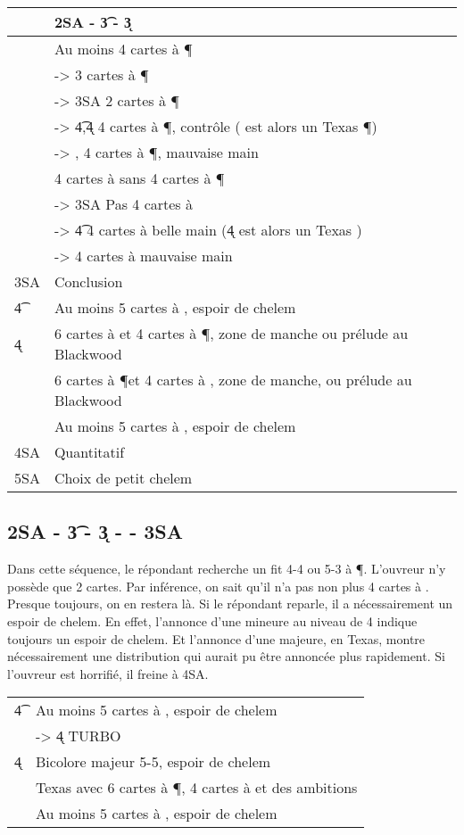 \documentclass[a4paper,12pt]{article}
\begin{document}
\begin{tabular}{|l|l|}
\hline
&2SA - \t3 - \k3\\
\hline
\co3 & Au moins 4 cartes à \P\\
& -> \p3 3 cartes à \P\\
& -> 3SA 2 cartes à \P \\
& -> \t4,\k4 4 cartes à \P, contrôle (\co4 est alors un Texas \P) \\
& -> \p4, 4 cartes à \P, mauvaise main \\
\hline
\p3  & 4 cartes à \C sans 4 cartes à \P \\
& -> 3SA Pas 4 cartes à \C\\
& -> \t4 4 cartes à \C belle main (\k4 est alors un Texas \C)\\
& -> \co4 4 cartes à \C mauvaise main\\
\hline
3SA & Conclusion \\
\t4 & Au moins 5 cartes à \K, espoir de chelem\\
\k4 & 6 cartes à \C et 4 cartes à \P, zone de manche ou prélude au Blackwood\\
\co4& 6 cartes à \P et 4 cartes à \C, zone de manche, ou prélude au Blackwood\\
\p4 & Au moins 5 cartes à \T, espoir de chelem\\
4SA & Quantitatif\\
5SA & Choix de petit chelem \\
\hline
\end{tabular}

\subsection*{2SA - \t3 - \k3 -  - 3SA}
Dans cette séquence, le répondant recherche un fit 4-4 ou 5-3 à \P. L'ouvreur n'y possède que 2 cartes.
Par inférence, on sait qu'il n'a pas non plus 4 cartes à \C.
Presque toujours, on en restera là. Si le répondant reparle, il a nécessairement un espoir de chelem. En effet, l'annonce d'une mineure au niveau de 4 indique toujours un espoir de chelem. Et l'annonce d'une majeure, en Texas, montre nécessairement une distribution qui aurait pu être annoncée plus rapidement.
Si l'ouvreur est horrifié, il freine à 4SA.

\begin{tabular}{ll}
  \t4 & Au moins 5 cartes à \K, espoir de chelem\\
 & -> \k4 TURBO\\
 \k4 & Bicolore majeur 5-5, espoir de chelem\\
 \co4 & Texas avec 6 cartes à \P, 4 cartes à \C et des ambitions\\ 
 \p4 & Au moins 5 cartes à \T, espoir de chelem\\ 
\end{tabular}
\end{document}
